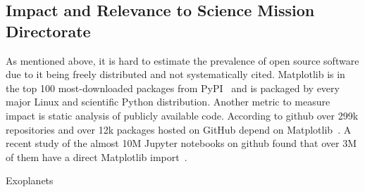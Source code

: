 \documentclass[12pt]{article}
\numberwithin{page}{section}
\begin{document}
\subsection{Impact and Relevance to Science Mission Directorate}



As mentioned above, it is hard to estimate the prevalence of open
source software due to it being freely distributed and not
systematically cited.  Matplotlib is in the top 100 most-downloaded
packages from PyPI~\cite{pypi_stats} and is packaged by every major
Linux and scientific Python distribution.  Another metric to measure
impact is static analysis of publicly available code.  According to
github over 299k repositories and over 12k packages hosted on GitHub
depend on Matplotlib~\cite{gh_deps:2021}. A recent study of the
almost 10M Jupyter notebooks on github found that over 3M of them have
a direct Matplotlib import~\cite{datalore:2020}.


Exoplanets \cite{2020AJ....160..116G}
\end{document}
